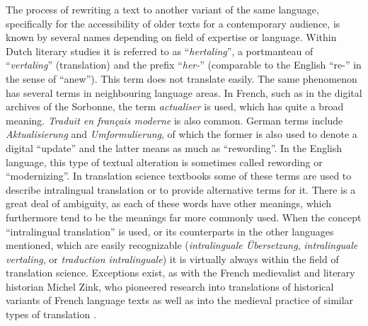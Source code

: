 \begin{paper}
The process of rewriting a text to another variant of the same language,
specifically for the accessibility of older texts for a contemporary
audience, is known by several names depending on field of expertise or
language. Within Dutch literary studies it is referred to as
``\emph{hertaling}'', a portmanteau of ``\emph{vertaling}''
(translation) and the prefix ``\emph{her-}'' (comparable to the English
``re-'' in the sense of ``anew''). This term does not translate easily.
The same phenomenon has several terms in neighbouring language areas. In
French, such as in the digital archives of the Sorbonne, the term
\emph{actualiser} is used, which has quite a broad meaning.
\emph{Traduit en français moderne} is also common. German terms include
\emph{Aktualisierung} and \emph{Umformulierung}, of which the former is
also used to denote a digital ``update'' and the latter means as much as
``rewording''. In the English language, this type of textual alteration is
sometimes called rewording or ``modernizing''. In translation science
textbooks some of these terms are used to describe intralingual
translation or to provide alternative terms for it. There is a great
deal of ambiguity, as each of these words have other meanings, which
furthermore tend to be the meanings far more commonly used. When the
concept ``intralingual translation'' is used, or its counterparts in the
other languages mentioned, which are easily recognizable
(\emph{intralinguale Übersetzung}, \emph{intralinguale vertaling}, or
\emph{traduction intralinguale}) it is virtually always within the field
of translation science. Exceptions exist, as with the French medievalist
and literary historian Michel Zink, who pioneered research into
translations of historical variants of French language texts as well as
into the medieval practice of similar types of translation \citep[16]{galderisi_lancien_2015}.


\end{paper}
